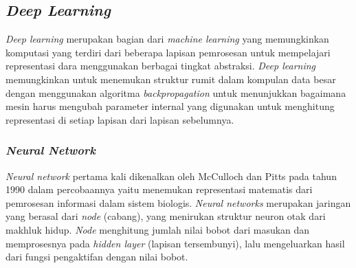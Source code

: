 \subsection{\emph{Deep Learning}}
\label{sec:deeplearning}

\emph{Deep learning} merupakan bagian dari \emph{machine learning} yang memungkinkan komputasi yang terdiri dari beberapa
lapisan pemrosesan untuk mempelajari representasi dara menggunakan berbagai tingkat abstraksi. \emph{Deep learning} memungkinkan untuk menemukan
struktur rumit dalam kompulan data besar dengan menggunakan algoritma \emph{backpropagation} untuk menunjukkan bagaimana mesin harus mengubah
parameter internal yang digunakan untuk menghitung representasi di setiap lapisan dari lapisan sebelumnya. \citep{lecun}

\subsubsection{\emph{Neural Network}}
\label{subsec:neuralnetwork}

\emph{Neural network} pertama kali dikenalkan oleh McCulloch dan Pitts pada tahun 1990 dalam percobaannya yaitu menemukan representasi
matematis dari pemrosesan informasi dalam sistem biologis. \emph{Neural networks} merupakan jaringan yang berasal dari \emph{node} (cabang), yang menirukan 
struktur neuron otak dari makhluk hidup. \emph{Node} menghitung jumlah nilai bobot dari masukan dan memprosesnya pada \emph{hidden layer} (lapisan tersembunyi), lalu 
mengeluarkan hasil dari fungsi pengaktifan dengan nilai bobot.


